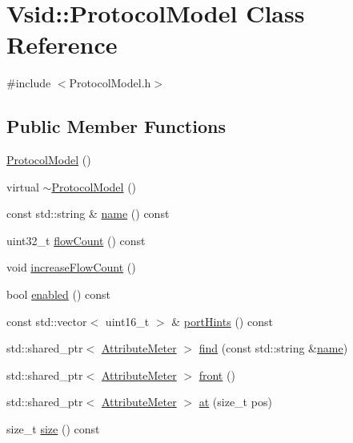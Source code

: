 \hypertarget{class_vsid_1_1_protocol_model}{\section{Vsid\-:\-:Protocol\-Model Class Reference}
\label{class_vsid_1_1_protocol_model}
}


{\ttfamily \#include $<$Protocol\-Model.\-h$>$}

\subsection*{Public Member Functions}
\begin{DoxyCompactItemize}
\item 
\hyperlink{class_vsid_1_1_protocol_model_a1d1fa4c2d7f4e60251cb6e661f985d61}{Protocol\-Model} ()
\item 
virtual \hyperlink{class_vsid_1_1_protocol_model_aa8c306c2ca0e5f06edcb3e7dfd4ab3be}{$\sim$\-Protocol\-Model} ()
\item 
const std\-::string \& \hyperlink{class_vsid_1_1_protocol_model_aff8f664f4e77d09edfa0cbfa5c780d53}{name} () const 
\item 
uint32\-\_\-t \hyperlink{class_vsid_1_1_protocol_model_aa41050fdf10addc595abf69bf53b7e3e}{flow\-Count} () const 
\item 
void \hyperlink{class_vsid_1_1_protocol_model_a2e9bdfe140c77a299a0e7b374d7ef42a}{increase\-Flow\-Count} ()
\item 
bool \hyperlink{class_vsid_1_1_protocol_model_a7aa80a01aed6b768e02df1bfaa168f58}{enabled} () const 
\item 
const std\-::vector$<$ uint16\-\_\-t $>$ \& \hyperlink{class_vsid_1_1_protocol_model_ae89609f0cba79ee0d2e55c5fb32f7377}{port\-Hints} () const 
\item 
std\-::shared\-\_\-ptr$<$ \hyperlink{class_vsid_1_1_attribute_meter}{Attribute\-Meter} $>$ \hyperlink{class_vsid_1_1_protocol_model_af1a8daae7d395fc5dc2804d2d75a3f2a}{find} (const std\-::string \&\hyperlink{class_vsid_1_1_protocol_model_aff8f664f4e77d09edfa0cbfa5c780d53}{name})
\item 
std\-::shared\-\_\-ptr$<$ \hyperlink{class_vsid_1_1_attribute_meter}{Attribute\-Meter} $>$ \hyperlink{class_vsid_1_1_protocol_model_a386f0c7974d09009ed36889e211b4191}{front} ()
\item 
std\-::shared\-\_\-ptr$<$ \hyperlink{class_vsid_1_1_attribute_meter}{Attribute\-Meter} $>$ \hyperlink{class_vsid_1_1_protocol_model_adb7900b67985cb22966e0cd22a1f9b00}{at} (size\-\_\-t pos)
\item 
size\-\_\-t \hyperlink{class_vsid_1_1_protocol_model_a0703ba5abd17744e10dcf30b578b799c}{size} () const 
\end{DoxyCompactItemize}

